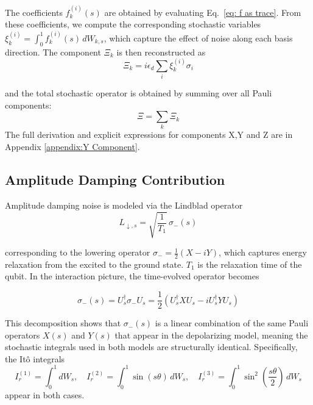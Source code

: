 \documentclass[9pt,a4paper,twocolumn,twoside]{tau-class/tau}
\begin{document}
The coefficients $f_k^{(i)}(s)$ are obtained by evaluating Eq.~\eqref{eq: f as trace}. From these coefficients, we compute the corresponding stochastic variables $\xi_k^{(i)} = \int_0^1 f_k^{(i)}(s)\, dW_{k,s}$, which capture the effect of noise along each basis direction. 
The component $\Xi_k$ is then reconstructed as 
\begin{equation}
    \Xi_k = i\epsilon_d \sum_i \xi_k^{(i)} \sigma_i
    \label{eq: sum over xi components}
\end{equation}

and the total stochastic operator is obtained by summing over all Pauli components: 
\begin{equation}
    \Xi = \sum_k \Xi_k
\end{equation}
The full derivation and explicit expressions for components X,Y and Z are in Appendix \ref{appendix:Y Component}. 

\subsection{Amplitude Damping Contribution}
Amplitude damping noise is modeled via the Lindblad operator 
\begin{equation}
    L_{\downarrow,s} = \sqrt{\frac{1}{T_1}} \, \sigma_-(s)
    \label{eq: Lindbald Amplitude Damping}
\end{equation}

corresponding to the lowering operator $\sigma_- = \frac{1}{2}(X - iY)$, which captures energy relaxation from the excited to the ground state. $T_1$ is the relaxation time of the qubit. In the interaction picture, the time-evolved operator becomes 

\begin{equation}
    \sigma_-(s) = U_s^\dagger \sigma_- U_s = \frac{1}{2}(U_s^\dagger X U_s - i U_s^\dagger Y U_s)
    \label{eq: Lowering operator}
\end{equation}

This decomposition shows that $\sigma_-(s)$ is a linear combination of the same Pauli operators $X(s)$ and $Y(s)$ that appear in the depolarizing model, meaning the stochastic integrals used in both models are structurally identical. Specifically, the Itô integrals
\begin{equation}
    I_r^{(1)}=\int_0^1 dW_s, \quad I_r^{(2)}=\int_0^1 \sin(s\theta)\, dW_s, \quad I_r^{(3)}=\int_0^1 \sin^2(\frac{s\theta}{2})\, dW_s
\end{equation}
appear in both cases. 
\end{document}
